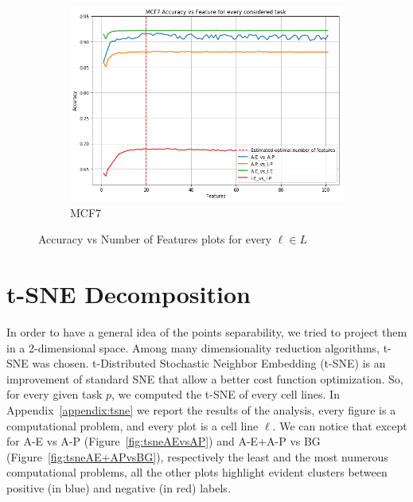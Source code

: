 \begin{figure}[!htb]
    \begin{subfigure}[b]{0.48\textwidth}
        \includegraphics[width=\textwidth]{images/features_plots_accuracy/MCF7_n_features.png}
        \caption{MCF7}
        \label{fig:MCF7_n_feat}
    \end{subfigure}
    \caption{Accuracy vs Number of Features plots for every $\ell \in L$}\label{fig:feats_plot_accuracy}
\end{figure}

\section{t-SNE Decomposition}
In order to have a general idea of the points separability, we tried to  project them in a 2-dimensional space. Among many dimensionality reduction algorithms, t-SNE was chosen. t-Distributed Stochastic Neighbor Embedding (t-SNE) \cite{vanDerMaaten2008} is an improvement of standard SNE \cite{HintonSNE} that allow a better cost function optimization. So, for every given task $p$, we  computed the t-SNE of every cell lines. 
In Appendix~\ref{appendix:tsne} we report the results of the analysis, every figure is a computational problem, and every plot is a cell line $\ell$. We can notice that except for A-E vs A-P (Figure~\ref{fig:tsneAEvsAP}) and A-E+A-P vs BG (Figure~\ref{fig:tsneAE+APvsBG}), respectively the least and the most numerous computational problems, all the other plots highlight evident clusters between positive (in blue) and negative (in red) labels. 